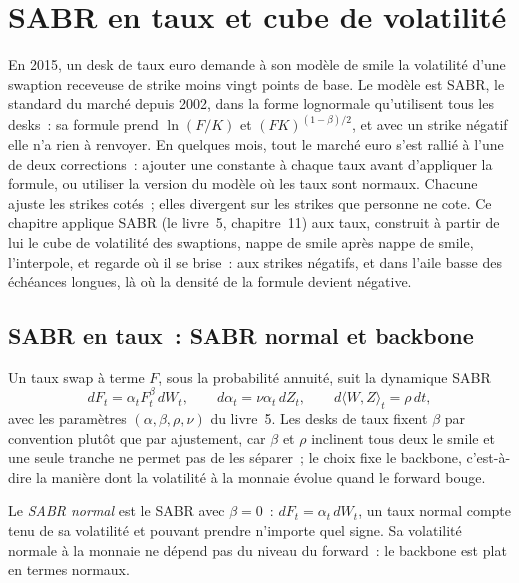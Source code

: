 \chapter{SABR en taux et cube de volatilité}\label{ch:rc:sabr-in-rates-and-the-volatility-cube}

En 2015, un desk de taux euro demande à son modèle de smile la volatilité
d'une swaption receveuse de strike moins vingt points de base. Le modèle est SABR, le
standard du marché depuis 2002, dans la forme lognormale qu'utilisent tous les desks~: sa
formule prend $\ln(F/K)$ et $(FK)^{(1-\beta)/2}$, et avec un strike négatif elle
n'a rien à renvoyer. En quelques mois, tout le marché euro s'est rallié à l'une de
deux corrections~: ajouter une constante à chaque taux avant d'appliquer la formule,
ou utiliser la version du modèle où les taux sont normaux. Chacune ajuste les
strikes cotés~; elles divergent sur les strikes que personne ne cote. Ce chapitre
applique SABR (le livre~5, chapitre~11) aux taux, construit à partir de lui le cube
de volatilité des swaptions, nappe de smile après nappe de smile, l'interpole,
et regarde où il se brise~: aux strikes négatifs, et dans l'aile basse des échéances
longues, là où la densité de la formule devient négative.

\section{SABR en taux~: SABR normal et backbone}

Un taux swap à terme $F$, sous la probabilité annuité, suit la dynamique SABR
\[
dF_t = \alpha_t F_t^{\beta}\,dW_t,\qquad d\alpha_t = \nu\alpha_t\,dZ_t,\qquad
d\langle W,Z\rangle_t = \rho\,dt ,
\]
avec les paramètres $(\alpha,\beta,\rho,\nu)$ du livre~5. Les desks de taux fixent
$\beta$ par convention plutôt que par ajustement, car $\beta$ et $\rho$ inclinent
tous deux le smile et une seule tranche ne permet pas de les séparer~; le choix
fixe le backbone, c'est-à-dire la manière dont la volatilité à la monnaie évolue quand le forward bouge.

\begin{definition}\label{def:rc:sabr-in-rates-and-the-volatility-cube:normal}
Le \emph{SABR normal} est le SABR avec $\beta=0$~: $dF_t=\alpha_t\,dW_t$,
un taux normal compte tenu de sa volatilité et pouvant prendre n'importe quel signe. Sa
volatilité normale à la monnaie ne dépend pas du niveau du forward~:
le backbone est plat en termes normaux.
\end{definition}

